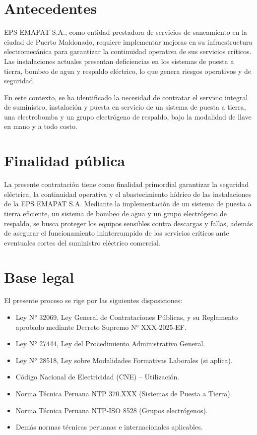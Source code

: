 \documentclass[12pt,a4paper]{article}
\begin{document}
\newpage
\tableofcontents
\newpage

\section{Antecedentes}

EPS EMAPAT S.A., como entidad prestadora de servicios de saneamiento en la ciudad de Puerto Maldonado, requiere implementar mejoras en su infraestructura electromecánica para garantizar la continuidad operativa de sus servicios críticos. Las instalaciones actuales presentan deficiencias en los sistemas de puesta a tierra, bombeo de agua y respaldo eléctrico, lo que genera riesgos operativos y de seguridad.

En este contexto, se ha identificado la necesidad de contratar el servicio integral de suministro, instalación y puesta en servicio de un sistema de puesta a tierra, una electrobomba y un grupo electrógeno de respaldo, bajo la modalidad de llave en mano y a todo costo.

\section{Finalidad pública}

La presente contratación tiene como finalidad primordial garantizar la seguridad eléctrica, la continuidad operativa y el abastecimiento hídrico de las instalaciones de la EPS EMAPAT S.A. Mediante la implementación de un sistema de puesta a tierra eficiente, un sistema de bombeo de agua y un grupo electrógeno de respaldo, se busca proteger los equipos sensibles contra descargas y fallas, además de asegurar el funcionamiento ininterrumpido de los servicios críticos ante eventuales cortes del suministro eléctrico comercial.

\section{Base legal}

El presente proceso se rige por las siguientes disposiciones:
\begin{itemize}
  \item Ley N° 32069, Ley General de Contrataciones Públicas, y su Reglamento aprobado mediante Decreto Supremo N° XXX-2025-EF.
  \item Ley N° 27444, Ley del Procedimiento Administrativo General.
  \item Ley N° 28518, Ley sobre Modalidades Formativas Laborales (si aplica).
  \item Código Nacional de Electricidad (CNE) -- Utilización.
  \item Norma Técnica Peruana NTP 370.XXX (Sistemas de Puesta a Tierra).
  \item Norma Técnica Peruana NTP-ISO 8528 (Grupos electrógenos).
  \item Demás normas técnicas peruanas e internacionales aplicables.
\end{itemize}
\end{document}
